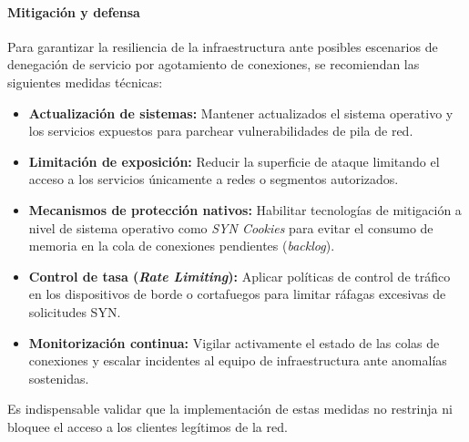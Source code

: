\paragraph{Mitigación y defensa}
Para garantizar la resiliencia de la infraestructura ante posibles escenarios de denegación de servicio por agotamiento de conexiones, se recomiendan las siguientes medidas técnicas:
\begin{itemize}
    \item \textbf{Actualización de sistemas:} Mantener actualizados el sistema operativo y los servicios expuestos para parchear vulnerabilidades de pila de red.
    \item \textbf{Limitación de exposición:} Reducir la superficie de ataque limitando el acceso a los servicios únicamente a redes o segmentos autorizados.
    \item \textbf{Mecanismos de protección nativos:} Habilitar tecnologías de mitigación a nivel de sistema operativo como \textit{SYN Cookies} para evitar el consumo de memoria en la cola de conexiones pendientes (\textit{backlog}).
    \item \textbf{Control de tasa (\textit{Rate Limiting}):} Aplicar políticas de control de tráfico en los dispositivos de borde o cortafuegos para limitar ráfagas excesivas de solicitudes SYN.
    \item \textbf{Monitorización continua:} Vigilar activamente el estado de las colas de conexiones y escalar incidentes al equipo de infraestructura ante anomalías sostenidas.
\end{itemize}
Es indispensable validar que la implementación de estas medidas no restrinja ni bloquee el acceso a los clientes legítimos de la red.

